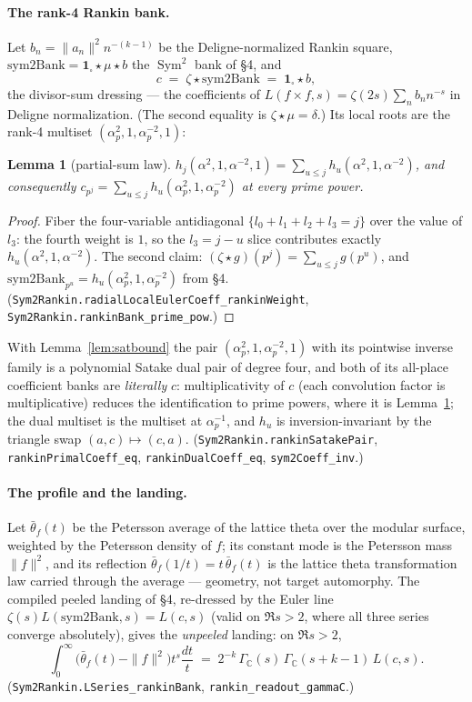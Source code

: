 \documentclass[11pt]{article}
\newtheorem{lemma}[theorem]{Lemma}
\newcommand{\Sym}{\operatorname{Sym}}
\newcommand{\Gm}{\Gamma_{\mathbb C}}
\begin{document}
\paragraph{The rank-4 Rankin bank.}  Let $b_n=\|a_n\|^2 n^{-(k-1)}$ be the Deligne-normalized
Rankin square, $\mathrm{sym2Bank}=\mathbf 1_{\square}\star\mu\star b$ the $\Sym^2$ bank of
\S4, and
\[
  c \;=\; \zeta\star\mathrm{sym2Bank}
   \;=\;\mathbf 1_{\square}\star b ,
\]
the divisor-sum dressing --- the coefficients of $L(f\times f,s)=\zeta(2s)\sum_n b_n n^{-s}$ in
Deligne normalization.  (The second equality is $\zeta\star\mu=\delta$.)  Its local roots are
the rank-4 multiset $(\alpha_p^2,1,\alpha_p^{-2},1)$:

\begin{lemma}[partial-sum law]\label{lem:partial}
$h_j(\alpha^2,1,\alpha^{-2},1)=\sum_{u\le j}h_u(\alpha^2,1,\alpha^{-2})$, and consequently
$c_{p^j}=\sum_{u\le j}h_u(\alpha_p^2,1,\alpha_p^{-2})$ at every prime power.
\end{lemma}
\begin{proof}
Fiber the four-variable antidiagonal $\{l_0+l_1+l_2+l_3=j\}$ over the value of $l_3$: the
fourth weight is $1$, so the $l_3=j-u$ slice contributes exactly
$h_u(\alpha^2,1,\alpha^{-2})$.  The second claim: $(\zeta\star g)(p^j)=\sum_{u\le j}g(p^u)$,
and $\mathrm{sym2Bank}_{p^u}=h_u(\alpha_p^2,1,\alpha_p^{-2})$ from \S4.
(\texttt{Sym2Rankin.radialLocalEulerCoeff\_rankinWeight},
\texttt{Sym2Rankin.rankinBank\_prime\_pow}.)
\end{proof}

With Lemma~\ref{lem:satbound} the pair $(\alpha_p^2,1,\alpha_p^{-2},1)$ with its pointwise
inverse family is a polynomial Satake dual pair of degree four, and both of its all-place
coefficient banks are \emph{literally} $c$: multiplicativity of $c$ (each convolution factor
is multiplicative) reduces the identification to prime powers, where it is
Lemma~\ref{lem:partial}; the dual multiset is the multiset at $\alpha_p^{-1}$, and
$h_u$ is inversion-invariant by the triangle swap $(a,c)\mapsto(c,a)$.
(\texttt{Sym2Rankin.rankinSatakePair}, \texttt{rankinPrimalCoeff\_eq},
\texttt{rankinDualCoeff\_eq}, \texttt{sym2Coeff\_inv}.)

\paragraph{The profile and the landing.}  Let $\bar\theta_f(t)$ be the Petersson average of the
lattice theta over the modular surface, weighted by the Petersson density of $f$; its constant
mode is the Petersson mass $\|f\|^2$, and its reflection
$\bar\theta_f(1/t)=t\,\bar\theta_f(t)$ is the lattice theta transformation law carried through
the average --- geometry, not target automorphy.  The compiled peeled landing of \S4, re-dressed
by the Euler line $\zeta(s)L(\mathrm{sym2Bank},s)=L(c,s)$ (valid on $\Re s>2$, where all three
series converge absolutely), gives the \emph{unpeeled} landing: on $\Re s>2$,
\[
  \int_0^\infty\bigl(\bar\theta_f(t)-\|f\|^2\bigr)t^{s}\frac{dt}{t}
   \;=\;2^{-k}\,\Gm(s)\,\Gm(s+k-1)\,L(c,s).
\]
(\texttt{Sym2Rankin.LSeries\_rankinBank}, \texttt{rankin\_readout\_gammaC}.)
\end{document}
